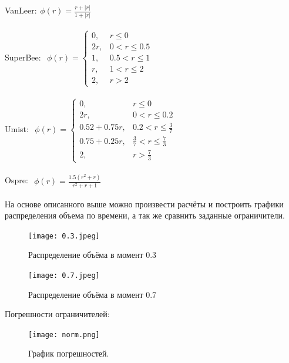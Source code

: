 VanLeer:$
\begin{aligned}
    \phi(r)=\frac{r+|r|}{1+|r|}
\end{aligned}
$


SuperBee: $
\begin{aligned}
    \phi(r)=\begin{cases}
        0, &r\leq 0\\
        2r, &0<r\leq 0.5\\
        1, &0.5<r\leq 1\\
        r, &1<r\leq 2\\
        2, &r>2
    \end{cases}
\end{aligned}
$


Umist: $
\begin{aligned}
    \phi(r)=\begin{cases}
        0, &r\leq 0\\
        2r, &0<r\leq 0.2\\
        0.52+0.75r, &0.2<r\leq \frac{3}{7}\\
        0.75+0.25r, &\frac{3}{7}<r\leq \frac{7}{3}\\
        2, &r>\frac{7}{3}
    \end{cases}
\end{aligned}
$


Ospre: $
\begin{aligned}
   \phi(r)=
    \frac{1.5(r^2+r)}{r^2+r+1}
\end{aligned}
$


На основе описанного выше можно произвести расчёты и построить графики распределения объема по времени, а так же сравнить
заданные ограничители.

\begin{figure}[h!]
    \centering
    \texttt{[image: 0.3.jpeg]}
    \caption{Распределение объёма в момент 0.3}
    \label{03}
\end{figure}

\begin{figure}[h!]
    \centering
     \texttt{[image: 0.7.jpeg]}
    \caption{Распределение объёма в момент 0.7}
    \label{07}
\end{figure}


Погрешности ограничителей:
\begin{figure}[h!]
    \centering
     \texttt{[image: norm.png]}
    \caption{График погрешностей.}
    \label{norms}
\end{figure}

